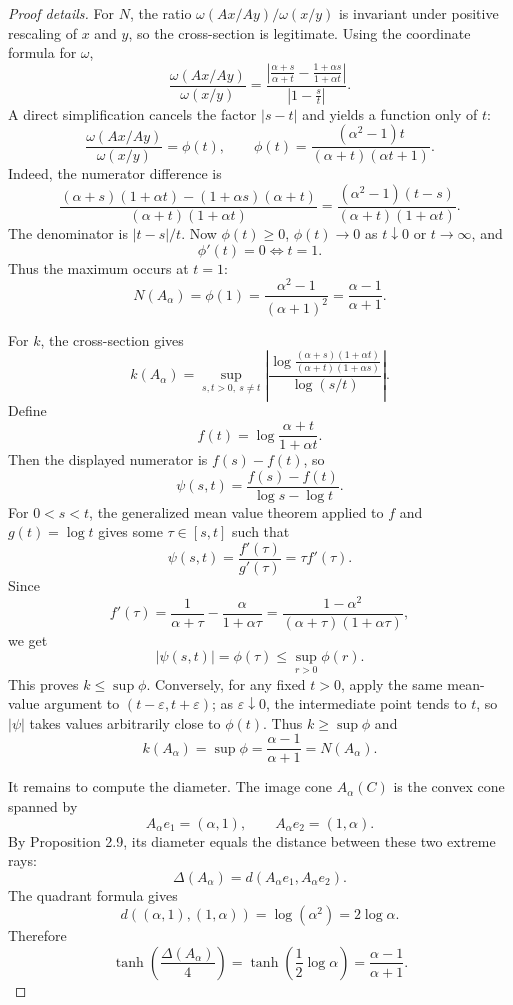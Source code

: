 \begin{proof}[Proof details]
For $N$, the ratio $\omega(Ax/Ay)/\omega(x/y)$ is invariant under positive rescaling of $x$ and $y$, so the cross-section is legitimate.
Using the coordinate formula for $\omega$,
\[
  \frac{\omega(Ax/Ay)}{\omega(x/y)}
  =
  \frac{\left|\frac{\alpha+s}{\alpha+t}-\frac{1+\alpha s}{1+\alpha t}\right|}
       {\left|1-\frac{s}{t}\right|}.
\]
A direct simplification cancels the factor $|s-t|$ and yields a function only of $t$:
\[
  \frac{\omega(Ax/Ay)}{\omega(x/y)}
  =\phi(t),
  \qquad
  \phi(t)=\frac{(\alpha^2-1)t}{(\alpha+t)(\alpha t+1)}.
\]
Indeed, the numerator difference is
\[
  \frac{(\alpha+s)(1+\alpha t)-(1+\alpha s)(\alpha+t)}{(\alpha+t)(1+\alpha t)}
  =\frac{(\alpha^2-1)(t-s)}{(\alpha+t)(1+\alpha t)}.
\]
The denominator is $|t-s|/t$.
Now $\phi(t)\ge0$, $\phi(t)\to0$ as $t\downarrow0$ or $t\to\infty$, and
\[
  \phi'(t)=0 \iff t=1.
\]
Thus the maximum occurs at $t=1$:
\[
  N(A_\alpha)=\phi(1)=\frac{\alpha^2-1}{(\alpha+1)^2}
  =\frac{\alpha-1}{\alpha+1}.
\]

For $k$, the cross-section gives
\[
  k(A_\alpha)=\sup_{s,t>0,
\ s\ne t}
  \left|\frac{
    \log\frac{(\alpha+s)(1+\alpha t)}{(\alpha+t)(1+\alpha s)}
  }{
    \log(s/t)
  }\right|.
\]
Define
\[
  f(t)=\log\frac{\alpha+t}{1+\alpha t}.
\]
Then the displayed numerator is $f(s)-f(t)$, so
\[
  \psi(s,t)=\frac{f(s)-f(t)}{\log s-\log t}.
\]
For $0<s<t$, the generalized mean value theorem applied to $f$ and $g(t)=\log t$ gives some $\tau\in[s,t]$ such that
\[
  \psi(s,t)=\frac{f'(\tau)}{g'(\tau)}=\tau f'(\tau).
\]
Since
\[
  f'(\tau)=\frac{1}{\alpha+\tau}-\frac{\alpha}{1+\alpha\tau}
  =\frac{1-\alpha^2}{(\alpha+\tau)(1+\alpha\tau)},
\]
we get
\[
  |\psi(s,t)|=\phi(\tau)\le\sup_{r>0}\phi(r).
\]
This proves $k\le \sup\phi$.
Conversely, for any fixed $t>0$, apply the same mean-value argument to $(t-\varepsilon,t+\varepsilon)$; as $\varepsilon\downarrow0$, the intermediate point tends to $t$, so $|\psi|$ takes values arbitrarily close to $\phi(t)$.
Thus $k\ge\sup\phi$ and
\[
  k(A_\alpha)=\sup\phi=\frac{\alpha-1}{\alpha+1}=N(A_\alpha).
\]

It remains to compute the diameter.
The image cone $A_\alpha(C)$ is the convex cone spanned by
\[
  A_\alpha e_1=(\alpha,1),
  \qquad
  A_\alpha e_2=(1,
\alpha).
\]
By Proposition 2.9, its diameter equals the distance between these two extreme rays:
\[
  \Delta(A_\alpha)=d(A_
\alpha e_1,A_\alpha e_2).
\]
The quadrant formula gives
\[
  d((\alpha,1),(1,
\alpha))=\log(\alpha^2)=2\log\alpha.
\]
Therefore
\[
  \tanh\!\left(\frac{\Delta(A_\alpha)}{4}\right)
  =\tanh\left(\frac12\log\alpha\right)
  =\frac{\alpha-1}{\alpha+1}.
\]
\end{proof}

